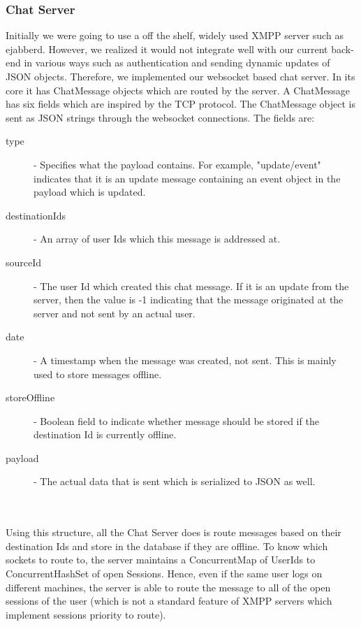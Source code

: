 \documentclass[10pt,a4paper]{article}
\begin{document}
\subsubsection{Chat Server}
Initially we were going to use a off the shelf, widely used XMPP server such as 
ejabberd. However, we realized it would not integrate well with our current 
back-end in various ways such as authentication and sending dynamic updates of 
JSON objects. Therefore, we implemented our websocket based chat server. In its 
core it has ChatMessage objects which are routed by the server. A ChatMessage 
has six fields which are inspired by the TCP protocol. The ChatMessage object is 
sent as JSON strings through the websocket connections. The fields are:
\begin{description}
\item[type] - Specifies what the payload contains. For example, "update/event" 
indicates that it is an update message containing an event object in the payload 
which is updated.
\item[destinationIds] - An array of user Ids which this message is addressed at.
\item[sourceId] - The user Id which created this chat message. If it is an 
update from the server, then the value is -1 indicating that the message 
originated at the server and not sent by an actual user.
\item[date] - A timestamp when the message was created, not sent. This is mainly 
used to store messages offline.
\item[storeOffline] - Boolean field to indicate whether message should be stored 
if the destination Id is currently offline.
\item[payload] - The actual data that is sent which is serialized to JSON as 
well.
\end{description}
\\
\\
\noindent Using this structure, all the Chat Server does is route messages based on their 
destination Ids and store in the database if they are offline. To know which 
sockets to route to, the server maintains a ConcurrentMap of UserIds to 
ConcurrentHashSet of open Sessions. Hence, even if the same user logs on 
different machines, the server is able to route the message to all of the open 
sessions of the user (which is not a standard feature of XMPP servers which 
implement sessions priority to route).
\end{document}
